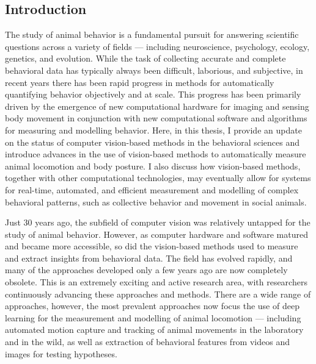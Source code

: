 \documentclass[11pt,a4paper,twoside]{book}
\begin{document}
\begin{doublespace}
	\chapter*{Introduction}
    The study of animal behavior is a fundamental pursuit for answering scientific questions across a variety of fields --- including neuroscience, psychology, ecology, genetics, and evolution. While the task of collecting accurate and complete behavioral data has typically always been difficult, laborious, and subjective, in recent years there has been rapid progress in methods for automatically quantifying behavior objectively and at scale. This progress has been primarily driven by the emergence of new computational hardware for imaging and sensing body movement in conjunction with new computational software and algorithms for measuring and modelling behavior. Here, in this thesis, I provide an update on the status of computer vision-based methods in the behavioral sciences and introduce advances in the use of vision-based methods to automatically measure animal locomotion and body posture. I also discuss how vision-based methods, together with other computational technologies, may eventually allow for systems for real-time, automated, and efficient measurement and modelling of complex behavioral patterns, such as collective behavior and movement in social animals.
	
	Just 30 years ago, the subfield of computer vision was relatively untapped for the study of animal behavior. However, as computer hardware and software matured and became more accessible, so did the vision-based methods used to measure and extract insights from behavioral data. The field has evolved rapidly, and many of the approaches developed only a few years ago are now completely obsolete. This is an extremely exciting and active research area, with researchers continuously advancing these approaches and methods. There are a wide range of approaches, however, the most prevalent approaches now focus the use of deep learning for the measurement and modelling of animal locomotion --- including automated motion capture and tracking of animal movements in the laboratory and in the wild, as well as extraction of behavioral features from videos and images for testing hypotheses.


\end{doublespace}
\end{document}
